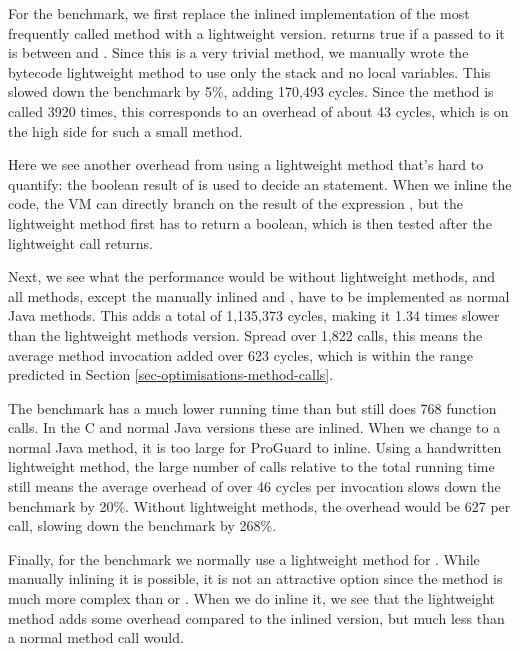For the  benchmark, we first replace the inlined implementation of the most frequently called method with a lightweight version.  returns true if a  passed to it is between  and . Since this is a very trivial method, we manually wrote the bytecode lightweight method to use only the stack and no local variables. This slowed down the benchmark by 5\%, adding 170,493 cycles. Since the method is called 3920 times, this corresponds to an overhead of about 43 cycles, which is on the high side for such a small method.

Here we see another overhead from using a lightweight method that's hard to quantify: the boolean result of  is used to decide an  statement. When we inline the code, the VM can directly branch on the result of the expression , but the lightweight method first has to return a boolean, which is then tested after the lightweight call returns.

Next, we see what the performance would be without lightweight methods, and all methods, except the manually inlined  and , have to be implemented as normal Java methods. This adds a total of 1,135,373 cycles, making it 1.34 times slower than the lightweight methods version. Spread over 1,822 calls, this means the average method invocation added over 623 cycles, which is within the range predicted in Section \ref{sec-optimisations-method-calls}.

The  benchmark has a much lower running time than  but still does 768 function calls. In the C and normal Java versions these are inlined. When we change  to a normal Java method, it is too large for ProGuard to inline. Using a handwritten lightweight method, the large number of calls relative to the total running time still means the average overhead of over 46 cycles per invocation slows down the benchmark by 20\%. Without lightweight methods, the overhead would be 627 per call, slowing down the benchmark by 268\%.

Finally, for the  benchmark we normally use a lightweight method for . While manually inlining it is possible, it is not an attractive option since the  method is much more complex than  or . When we do inline it, we see that the lightweight method adds some overhead compared to the inlined version, but much less than a normal method call would.

